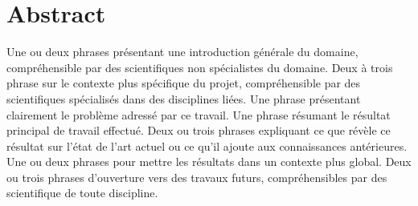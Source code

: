 \chapter*{\Large \center Abstract}

Une ou deux phrases présentant une introduction générale du domaine, compréhensible par des scientifiques non spécialistes du domaine.
Deux à trois phrase sur le contexte plus spécifique du projet, compréhensible par des scientifiques spécialisés dans des disciplines liées.
Une phrase présentant clairement le problème adressé par ce travail.
Une phrase résumant le résultat principal de travail effectué.
Deux ou trois phrases expliquant ce que révèle ce résultat sur l'état de l'art actuel ou ce qu'il ajoute aux connaissances antérieures.
Une ou deux phrases pour mettre les résultats dans un contexte plus global.
Deux ou trois phrases d'ouverture vers des travaux futurs, compréhensibles par des scientifique de toute discipline.

